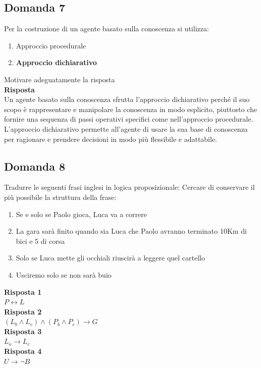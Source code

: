 \documentclass[../main.tex]{subfiles}
\begin{document}
	\subsection{Domanda 7}
	Per la costruzione di un agente basato sulla conoscenza si utilizza: 
	\begin{enumerate}
		\item Approccio procedurale 
		\item \textbf{Approccio dichiarativo}
	\end{enumerate}
	Motivare adeguatamente la risposta\\
	\textbf{Risposta}\\
	Un agente basato sulla conoscenza sfrutta l'approccio dichiarativo perché il suo scopo è rappresentare e manipolare la conoscenza in modo esplicito, piuttosto che fornire una sequenza di passi operativi specifici come nell'approccio procedurale.\\ L'approccio dichiarativo permette all'agente di usare la sua base di conoscenza per ragionare e prendere decisioni in modo più flessibile e adattabile.
	\subsection{Domanda 8}
	Tradurre le seguenti frasi inglesi in logica proposizionale: Cercare di conservare il più possibile la struttura della frase:
	\begin{enumerate}
		\item Se e solo se Paolo gioca, Luca va a correre 
		\item La gara sarà finito quando sia Luca che Paolo avranno terminato 10Km di bici e 5 di corsa 
		\item Solo se Luca mette gli occhiali riuscirà a leggere quel cartello 
		\item Usciremo solo se non sarà buio
	\end{enumerate}
	\textbf{Risposta 1}\\
	$P \leftrightarrow L$\\
	\textbf{Risposta 2}\\
	$(L_b \land L_c) \land (P_b \land P_c) \rightarrow G$\\
	\textbf{Risposta 3}\\
	$L_o \rightarrow L_c$\\
	\textbf{Risposta 4}\\
	$U \rightarrow \neg B$
\end{document}
